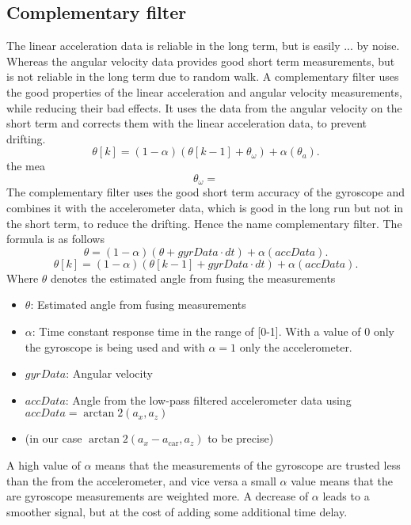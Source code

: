 \subsection{Complementary filter}
The linear acceleration data is reliable in the long term, but is easily ... by noise.
Whereas the angular velocity data provides good short term measurements, but is not reliable in the long term due to random walk.
A complementary filter uses the good properties of the linear acceleration and angular velocity measurements, while reducing their bad effects.
It uses the data from the angular velocity on the short term and corrects them with the linear acceleration data, to prevent drifting.
\begin{equation}
    \theta[k] = (1-\alpha)(\theta[k-1] + \theta_\omega) + \alpha(\theta_a).
\end{equation}
the mea
\begin{equation}
    \theta_\omega =
\end{equation}
The complementary filter uses the good short term accuracy of the gyroscope and combines it with the accelerometer data, which is good in the long run but not in the short term, to reduce the drifting.
Hence the name complementary filter. The formula is as follows
\begin{equation}
    \theta = (1-\alpha)(\theta + gyrData\cdot dt) + \alpha(accData).
\end{equation}
\begin{equation}
    \theta[k] = (1-\alpha)(\theta[k-1] + gyrData\cdot dt) + \alpha(accData).
\end{equation}
Where $\theta$ denotes the estimated angle from fusing the measurements
\begin{itemize}
    \item $\theta$: Estimated angle from fusing measurements
    \item $\alpha$: Time constant response time in the range of [0-1]. With a value of 0 only the gyroscope is being used and with $\alpha=1$ only the accelerometer.
    \item $gyrData$: Angular velocity
    \item $accData$: Angle from the low-pass filtered accelerometer data using $accData = \arctan2(a_x, a_z)$
        \item (in our case $\arctan2(a_x-a_\mathrm{car}, a_z)$ to be precise)
\end{itemize}

A high value of $\alpha$ means that the measurements of the gyroscope are trusted less than the from the accelerometer, and vice versa a small $\alpha$ value means that the are gyroscope measurements are weighted more.
A decrease of $\alpha$ leads to a smoother signal, but at the cost of adding some additional time delay.


